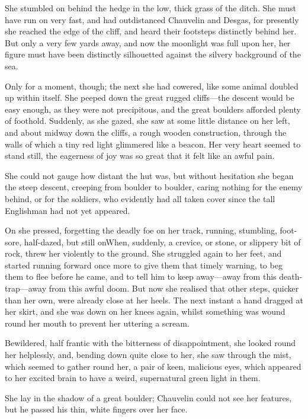 She stumbled on behind the hedge in the low, thick grass of the ditch. She must have run on very fast, and had outdistanced Chauvelin and Desgas, for presently she reached the edge of the cliff, and heard their footsteps distinctly behind her. But only a very few yards away, and now the moonlight was full upon her, her figure must have been distinctly silhouetted against the silvery background of the sea.

Only for a moment, though; the next she had cowered, like some animal doubled up within itself. She peeped down the great rugged cliffs—the descent would be easy enough, as they were not precipitous, and the great boulders afforded plenty of foothold. Suddenly, as she gazed, she saw at some little distance on her left, and about midway down the cliffs, a rough wooden construction, through the walls of which a tiny red light glimmered like a beacon. Her very heart seemed to stand still, the eagerness of joy was so great that it felt like an awful pain.

She could not gauge how distant the hut was, but without hesitation she began the steep descent, creeping from boulder to boulder, caring nothing for the enemy behind, or for the soldiers, who evidently had all taken cover since the tall Englishman had not yet appeared.

On she pressed, forgetting the deadly foe on her track, running, stumbling, foot-sore, half-dazed, but still on\textellipsis \allowbreak  When, suddenly, a crevice, or stone, or slippery bit of rock, threw her violently to the ground. She struggled again to her feet, and started running forward once more to give them that timely warning, to beg them to flee before he came, and to tell him to keep away—away from this death-trap—away from this awful doom. But now she realised that other steps, quicker than her own, were already close at her heels. The next instant a hand dragged at her skirt, and she was down on her knees again, whilst something was wound round her mouth to prevent her uttering a scream.

Bewildered, half frantic with the bitterness of disappointment, she looked round her helplessly, and, bending down quite close to her, she saw through the mist, which seemed to gather round her, a pair of keen, malicious eyes, which appeared to her excited brain to have a weird, supernatural green light in them.

She lay in the shadow of a great boulder; Chauvelin could not see her features, but he passed his thin, white fingers over her face.

